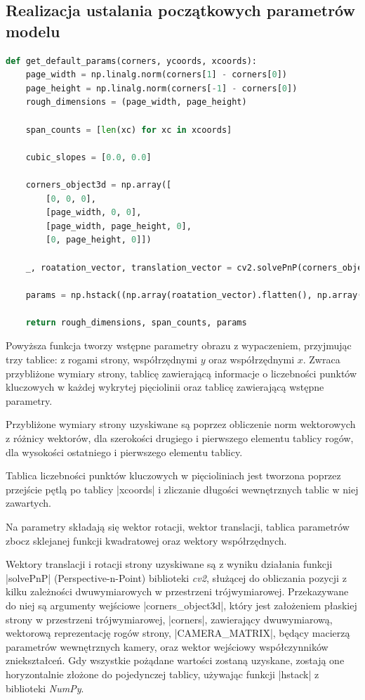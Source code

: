 \subsection{Realizacja ustalania początkowych parametrów modelu}
\begin{lstlisting}[caption={\pyth| get_default_params()| - funkcja tworząca początkowe parametry obrazu.}, label={get-default-params}, language=Python]
def get_default_params(corners, ycoords, xcoords):
	page_width = np.linalg.norm(corners[1] - corners[0])
	page_height = np.linalg.norm(corners[-1] - corners[0])
	rough_dimensions = (page_width, page_height)
	
	span_counts = [len(xc) for xc in xcoords]
	
	cubic_slopes = [0.0, 0.0]
	
	corners_object3d = np.array([
		[0, 0, 0],
		[page_width, 0, 0],
		[page_width, page_height, 0],
		[0, page_height, 0]])
	
	_, roatation_vector, translation_vector = cv2.solvePnP(corners_object3d, corners, CAMERA_MATRIX, np.zeros(5))
	
	params = np.hstack((np.array(roatation_vector).flatten(), np.array(translation_vector).flatten(), np.array(cubic_slopes).flatten(), ycoords.flatten()) + tuple(xcoords))
	
	return rough_dimensions, span_counts, params
\end{lstlisting}

Powyższa funkcja tworzy wstępne parametry obrazu z wypaczeniem, przyjmując trzy tablice: z rogami strony, współrzędnymi $y$ oraz współrzędnymi $x$. Zwraca przybliżone wymiary strony, tablicę zawierającą informacje o liczebności punktów kluczowych w każdej wykrytej pięciolinii oraz tablicę zawierającą wstępne parametry.

Przybliżone wymiary strony uzyskiwane są poprzez obliczenie norm wektorowych z różnicy wektorów, dla szerokości drugiego i pierwszego elementu tablicy rogów, dla wysokości ostatniego i pierwszego elementu tablicy. 

Tablica liczebności punktów kluczowych w pięcioliniach jest tworzona poprzez przejście pętlą po tablicy \pyth|xcoords| i zliczanie długości wewnętrznych tablic w niej zawartych.

Na parametry składają się wektor rotacji, wektor translacji, tablica parametrów zbocz sklejanej funkcji kwadratowej oraz wektory współrzędnych. 

Wektory translacji i rotacji strony uzyskiwane są z wyniku działania funkcji \pyth|solvePnP| (Perspective-n-Point) biblioteki \textit{cv2}, służącej do obliczania pozycji z kilku zależności dwuwymiarowych w przestrzeni trójwymiarowej. Przekazywane do niej są argumenty wejściowe \pyth|corners_object3d|, który jest założeniem płaskiej strony w przestrzeni trójwymiarowej, \pyth|corners|, zawierający dwuwymiarową, wektorową reprezentację rogów strony, \pyth|CAMERA_MATRIX|, będący macierzą parametrów wewnętrznych kamery, oraz wektor wejściowy współczynników zniekształceń. Gdy wszystkie pożądane wartości zostaną uzyskane, zostają one horyzontalnie złożone do pojedynczej tablicy, używając funkcji \pyth|hstack| z biblioteki \textit{NumPy}.



